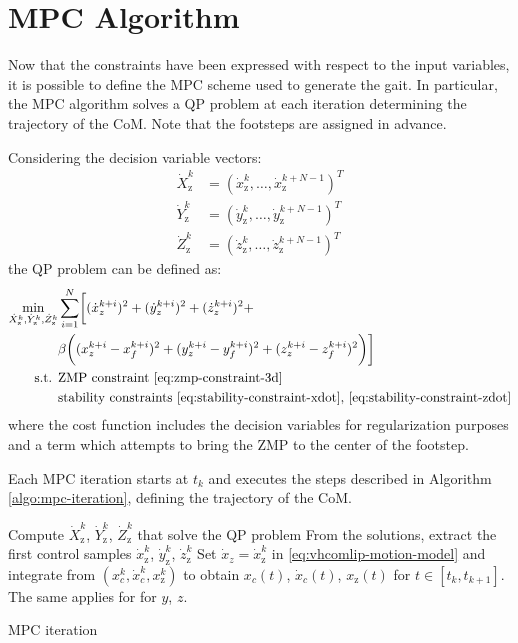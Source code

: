 \section{MPC Algorithm}
Now that the constraints have been expressed with respect to the input
variables, it is possible to define the MPC scheme used to generate the gait.
In particular, the MPC algorithm solves a QP problem at each iteration
determining the trajectory of the CoM. Note that the footsteps are assigned in 
advance.

Considering the decision variable vectors:
\begin{align}
  \dot{X}_\text{z}^k&=(\dot{x}_\text{z}^k, \dots, \dot{x}_\text{z}^{k+N-1})^T \\
  \dot{Y}_\text{z}^k&=(\dot{y}_\text{z}^k, \dots, \dot{y}_\text{z}^{k+N-1})^T \\
  \dot{Z}_\text{z}^k&=(\dot{z}_\text{z}^k, \dots, \dot{z}_\text{z}^{k+N-1})^T
\end{align}
the QP problem can be defined as:
\begin{align*}
  \min_{\dot{X}_\text{z}^k, \dot{Y}_\text{z}^k, \dot{Z}_\text{z}^k}
      &\sum_{i=1}^N
      \biggl[
          (\dot{x}_z^{k+i})^2 +
          (\dot{y}_z^{k+i})^2 +
          (\dot{z}_z^{k+i})^2 + \\
          &\beta \biggl(
              (x_z^{k+i} - x_f^{k+i})^2 +
              (y_z^{k+i} - y_f^{k+i})^2 +
              (z_z^{k+i} - z_f^{k+i})^2
          \biggr)
      \biggr]\\
      \textrm{s.t. } &\textrm{ZMP constraint \eqref{eq:zmp-constraint-3d}} \\
      &\textrm{stability constraints \eqref{eq:stability-constraint-xdot},
          \eqref{eq:stability-constraint-zdot}}
\end{align*}
where the cost function includes the decision variables for regularization 
purposes and a term which attempts to bring the ZMP to the center of the 
footstep.

Each MPC iteration starts at $t_k$ and executes the steps described in Algorithm
\ref{algo:mpc-iteration}, defining the trajectory of the CoM.
\begin{algorithm}
\SetAlgoLined
{}
  Compute $\dot{X}_\text{z}^k$, $\dot{Y}_\text{z}^k$, $\dot{Z}_\text{z}^k$ 
      that solve the QP problem\;
  From the solutions, extract the first control samples
      $\dot{x}_\text{z}^k$, $\dot{y}_\text{z}^k$, $\dot{z}_\text{z}^k$\;
  Set $\dot{x}_z=\dot{x}_\text{z}^k$ in \eqref{eq:vhcomlip-motion-model}
      and integrate from $(x_c^k, \dot{x}_c^k, x_\text{z}^k)$ to obtain 
      $x_c(t)$, $\dot{x}_c(t)$, $x_\text{z}(t)$ for
      $t \in [t_k, t_{k+1}]$. The same applies for for $y$, $z$.
  \caption{MPC iteration}
  \label{algo:mpc-iteration}
\end{algorithm}

